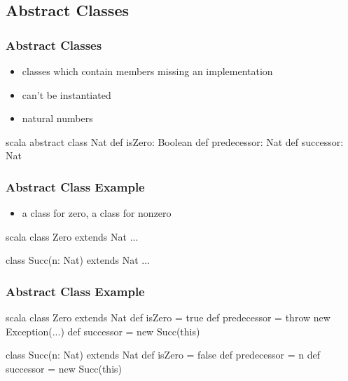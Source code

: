 \documentclass[dvipsnames]{beamer}
\theoremstyle{plain}
\begin{document}
\subsection{Abstract Classes}

\begin{frame}[fragile]
  \frametitle{Abstract Classes}

  \begin{itemize}
    \item classes which contain members missing an implementation
    \item can't be instantiated
  \end{itemize}

  \pause
  \begin{example}[Scala]
    \begin{itemize}
      \item natural numbers
    \end{itemize}

    \begin{pygments}{scala}
abstract class Nat {
    def isZero: Boolean
    def predecessor: Nat
    def successor: Nat
}
    \end{pygments}
  \end{example}
\end{frame}

\begin{frame}[fragile]
  \frametitle{Abstract Class Example}

  \begin{example}[Scala]
    \begin{itemize}
      \item a class for zero, a class for nonzero
    \end{itemize}

    \medskip
    \begin{pygments}{scala}
class Zero extends Nat ...

class Succ(n: Nat) extends Nat ...
    \end{pygments}
  \end{example}
\end{frame}

\begin{frame}[fragile]
  \frametitle{Abstract Class Example}

  \begin{example}[Scala]
    \begin{pygments}{scala}
class Zero extends Nat {
    def isZero = true
    def predecessor = throw new Exception(...)
    def successor = new Succ(this)
}

class Succ(n: Nat) extends Nat {
    def isZero = false
    def predecessor = n
    def successor = new Succ(this)
}
    \end{pygments}
  \end{example}
\end{frame}
\end{document}
